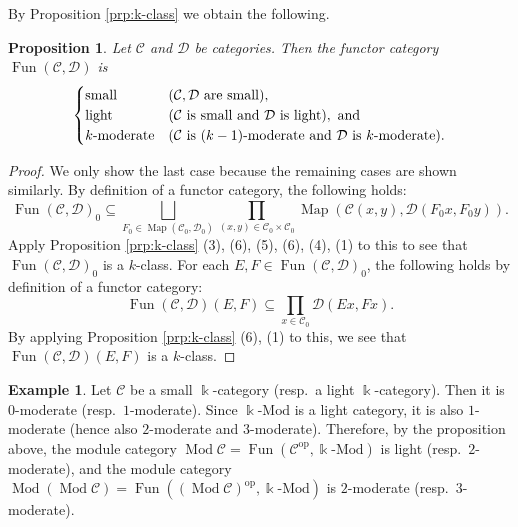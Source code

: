 \documentclass{surv-l}
\numberwithin{equation}{chapter}
\numberwithin{figure}{chapter}
\theoremstyle{plain}
\newtheorem{prp}[thm]{Proposition}
\theoremstyle{definition}
\newtheorem{exm}[thm]{Example}
\theoremstyle{remark}
\newcommand{\kMod}{\Bbbk\text{-}\mathrm{Mod}}
\DeclareMathOperator{\Mod}{Mod}
\DeclareMathOperator{\Fun}{Fun}
\DeclareMathOperator{\Map}{Map}
\begin{document}
By Proposition  \ref{prp:k-class} we obtain the following.

\begin{prp}\label{prp:fun-cat}
Let ${\mathcal{C}}$ and ${\mathcal{D}}$ be categories.
Then the functor category $\Fun({\mathcal{C}}, {\mathcal{D}})$ is
\[
\begin{cases}
\text{small } &({\mathcal{C}}, {\mathcal{D}}\text{ are small\/}),\\
\text{light} &({\mathcal{C}}\text{ is small and }{\mathcal{D}}\text{ is light}), \text{ and}\\
\text{$k$-moderate}&({\mathcal{C}}\text{ is $(k-1)$-moderate and } {\mathcal{D}} \text{ is $k$-moderate}).
\end{cases}
\]
\end{prp}

\begin{proof}
We only show the last case because the remaining cases are shown similarly.
By definition of a functor category, the following holds:
\[
\Fun({\mathcal{C}}, {\mathcal{D}})_0 \subseteq
\bigsqcup_{F_0 \in \Map({\mathcal{C}}_0,{\mathcal{D}}_0)}
\prod_{(x,y) \in {\mathcal{C}}_0\times {\mathcal{C}}_0}\Map({\mathcal{C}}(x,y), {\mathcal{D}}(F_0x, F_0y)).
\]
Apply Proposition \ref{prp:k-class} (3), (6), (5), (6), (4), (1) to this
to see that
$\Fun({\mathcal{C}}, {\mathcal{D}})_0$ is a $k$-class.
For each $E, F \in \Fun({\mathcal{C}}, {\mathcal{D}})_0$,
the following holds by definition of a functor category:
\[
\Fun({\mathcal{C}}, {\mathcal{D}})(E, F) \subseteq
\prod_{x \in {\mathcal{C}}_0} {\mathcal{D}}(Ex, Fx).
\]
By applying Proposition  \ref{prp:k-class} (6), (1) to this,
we see that $\Fun({\mathcal{C}}, {\mathcal{D}})(E, F)$ is a $k$-class.
\end{proof}

\begin{exm}\label{exm:Fun-not-modt}
Let ${\mathcal{C}}$ be a small $\Bbbk$-category (resp.\ a light $\Bbbk$-category).
Then it is $0$-moderate (resp.\ $1$-moderate).
Since $\kMod$ is a light category, it is also $1$-moderate
(hence also $2$-moderate and $3$-moderate).
Therefore, by the proposition above,
the module category $\Mod {\mathcal{C}} = \Fun({\mathcal{C}}^{\mathrm{op}}, \kMod)$ is
light (resp.\ $2$-moderate), and
the module category $\Mod(\Mod {\mathcal{C}}) = \Fun((\Mod{\mathcal{C}})^{\mathrm{op}}, \kMod)$
is $2$-moderate (resp.\ $3$-moderate).
\end{exm}
\end{document}
